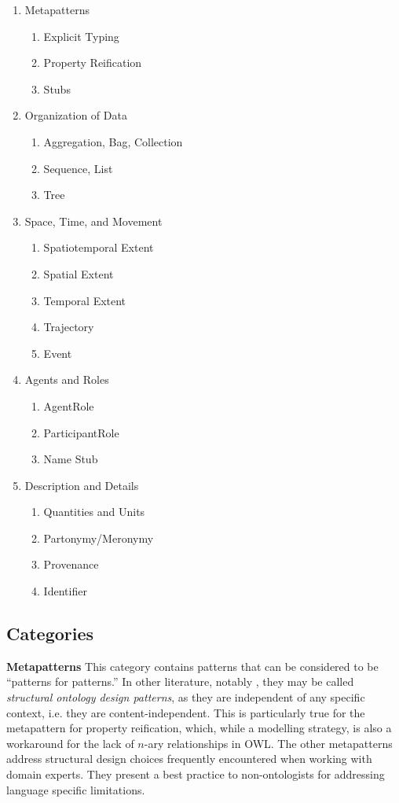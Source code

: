 \begin{enumerate}
\item Metapatterns
\begin{enumerate}
\item Explicit Typing
\item Property Reification
\item Stubs
\end{enumerate}
\item Organization of Data
\begin{enumerate}
\item Aggregation, Bag, Collection
\item Sequence, List
\item Tree
\end{enumerate}
\item Space, Time, and Movement
\begin{enumerate}
\item Spatiotemporal Extent
\item Spatial Extent
\item Temporal Extent
\item Trajectory
\item Event
\end{enumerate} 
\item Agents and Roles
\begin{enumerate}
\item AgentRole
\item ParticipantRole
\item Name Stub
\end{enumerate}
\item Description and Details
\begin{enumerate}
\item Quantities and Units
\item Partonymy/Meronymy
\item Provenance
\item Identifier
\end{enumerate}
\end{enumerate}

\subsection*{Categories}
\noindent\textbf{Metapatterns} This category contains patterns that can be considered to be ``patterns for patterns.'' In other literature, notably \cite{odp1}, they may be called \emph{structural ontology design patterns}, as they are independent of any specific context, i.e. they are content-independent. This is particularly true for the metapattern for property reification, which, while a modelling strategy, is also a workaround for the lack of $n$-ary relationships in OWL. The other metapatterns address structural design choices frequently encountered when working with domain experts. They present a best practice to non-ontologists for addressing language specific limitations.

